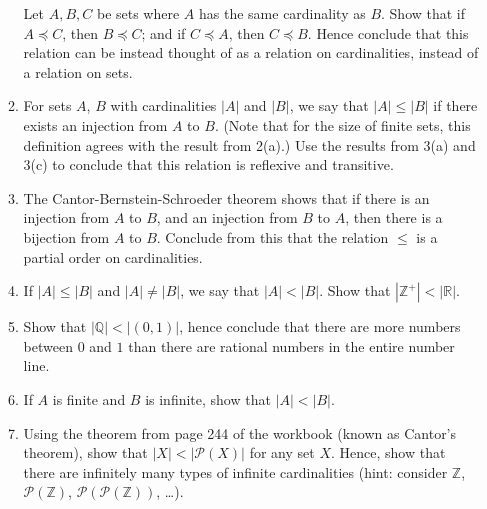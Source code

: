 \documentclass[a4paper,12pt]{article}
\newcommand{\Z}{\mathbb{Z}}
\newcommand{\Q}{\mathbb{Q}}
\newcommand{\R}{\mathbb{R}}
\begin{document}
\begin{enumerate}
\begin{enumerate}
Let $A, B, C$ be sets where $A$ has the same cardinality as $B$. Show that
if $A \preceq C$, then $B \preceq C$; and if $C \preceq A$, then $C \preceq B$.
Hence conclude that this relation can be instead thought of as a relation on
cardinalities, instead of a relation on sets.
\item
For sets $A$, $B$ with cardinalities $|A|$ and $|B|$, we say that
$|A| \leq |B|$ if there exists an injection from $A$ to $B$.
(Note that for the size of finite sets, this definition agrees with the result
from 2(a).)
Use the results from 3(a) and 3(c) to conclude that this relation is
reflexive and transitive.
\item The Cantor-Bernstein-Schroeder theorem shows that if there is an injection
from $A$ to $B$, and an injection from $B$ to $A$, then there is a bijection
from $A$ to $B$.
Conclude from this that the relation $\leq$ is a partial order on cardinalities.
\item If $|A| \leq |B|$ and $|A| \neq |B|$, we say that $|A| < |B|$.
Show that $|\Z^+| < |\R|$.
\item Show that $|\Q| < |(0, 1)|$, hence conclude that there are more numbers
between $0$ and $1$ than there are rational numbers in the entire number line.
\item If $A$ is finite and $B$ is infinite, show that $|A| < |B|$.
\item Using the theorem from page 244 of the workbook (known as Cantor's
theorem), show that $|X| < |\mathcal{P}(X)|$ for any set $X$.
Hence, show that there are infinitely many types of infinite cardinalities
(hint: consider $\Z$, $\mathcal{P}(\Z)$, $\mathcal{P}(\mathcal{P}(\Z))$, \dots).
\end{enumerate}
\end{enumerate}
\end{document}
